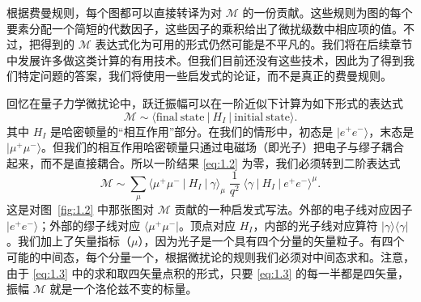 根据费曼规则，每个图都可以直接转译为对 $\mathcal{M}$ 的一份贡献。这些规则为图的每个要素分配一个简短的代数因子，这些因子的乘积给出了微扰级数中相应项的值。不过，把得到的 $\mathcal{M}$ 表达式化为可用的形式仍然可能是不平凡的。我们将在后续章节中发展许多做这类计算的有用技术。但我们目前还没有这些技术，因此为了得到我们特定问题的答案，我们将使用一些启发式的论证，而不是真正的费曼规则。

回忆在量子力学微扰论中，跃迁振幅可以在一阶近似下计算为如下形式的表达式
\begin{equation}
  \mathcal{M} \sim \langle \mathrm{final\ state}\ |\ H_I\ |\ \mathrm{initial\ state}\rangle.
  \label{eq:1.2}
\end{equation}
其中 $H_I$ 是哈密顿量的``相互作用''部分。在我们的情形中，初态是 $|e^{+}e^{-}\rangle$，末态是 $|\mu^{+}\mu^{-}\rangle$。但我们的相互作用哈密顿量只通过电磁场（即光子）把电子与缪子耦合起来，而不是直接耦合。所以一阶结果 \eqref{eq:1.2} 为零，我们必须转到二阶表达式
\begin{equation}
  \mathcal{M} \sim
  \sum_{\mu} \langle \mu^{+}\mu^{-}\ |\ H_I\ |\ \gamma\rangle_\mu\;
  \frac{1}{q^2}\;
  \langle \gamma\ |\ H_I\ |\ e^{+}e^{-}\rangle^\mu .
  \label{eq:1.3}
\end{equation}
这是对图~\ref{fig:1.2} 中那张图对 $\mathcal{M}$ 贡献的一种启发式写法。外部的电子线对应因子 $|e^{+}e^{-}\rangle$；外部的缪子线对应 $\langle\mu^{+}\mu^{-}|$。顶点对应 $H_I$，内部的光子线对应算符 $|\gamma\rangle\langle \gamma|$。我们加上了矢量指标（$\mu$），因为光子是一个具有四个分量的矢量粒子。有四个可能的中间态，每个分量一个，根据微扰论的规则我们必须对中间态求和。注意，由于 \eqref{eq:1.3} 中的求和取四矢量点积的形式，只要 \eqref{eq:1.3} 的每一半都是四矢量，振幅 $\mathcal{M}$ 就是一个洛伦兹不变的标量。

